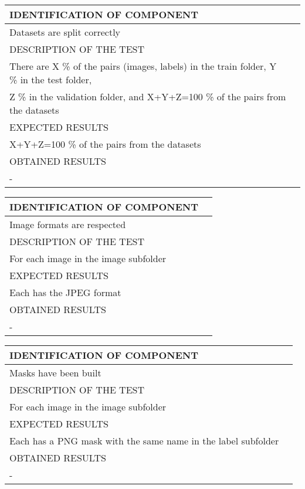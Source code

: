 \documentclass{polytech/polytech}
\numberwithin{figure}{chapter}
\begin{document}
\begin{appendix}
\begin{table}[]
\begin{tabular}{|l|l|}\hline
\color{C} IDENTIFICATION OF COMPONENT \\\hline
Datasets are split correctly  \\\hline
\color{C} DESCRIPTION OF THE TEST\\\hline
There are X \% of the pairs (images, labels) in the train folder, Y \% in the test folder,\\ Z \% in the validation folder, and X+Y+Z=100 \% of the pairs from the datasets \\\hline
\color{C} EXPECTED RESULTS \\\hline
X+Y+Z=100 \% of the pairs from the datasets \\\hline
\color{C} OBTAINED RESULTS \\\hline
- \\\hline
\end{tabular}
\end{table}

\begin{table}[]
\begin{tabular}{|l|l|}\hline
\color{C} IDENTIFICATION OF COMPONENT \\\hline
Image formats are respected  \\\hline
\color{C} DESCRIPTION OF THE TEST\\\hline
For each image in the image subfolder  \\\hline
\color{C} EXPECTED RESULTS \\\hline
Each has the JPEG format \\\hline
\color{C} OBTAINED RESULTS \\\hline
- \\\hline
\end{tabular}
\end{table}

\begin{table}[]
\begin{tabular}{|l|l|}\hline
\color{C} IDENTIFICATION OF COMPONENT \\\hline
Masks have been built  \\\hline
\color{C} DESCRIPTION OF THE TEST\\\hline
For each image in the image subfolder \\\hline
\color{C} EXPECTED RESULTS \\\hline
Each has a PNG mask with the same name in the label subfolder \\\hline
\color{C} OBTAINED RESULTS \\\hline
- \\\hline
\end{tabular}
\end{table}


\end{appendix}
\end{document}
